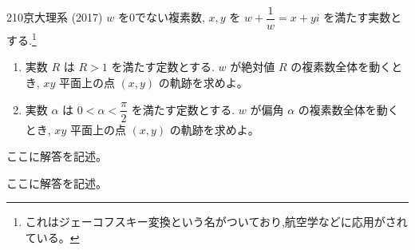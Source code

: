 \begin{thm}{210}{\maru}{京大理系 (2017)}
 $w$ を0でない複素数, $x,y$ を $w+\dfrac{1}{w}=x+yi$ を満たす実数とする.\footnote{これはジェーコフスキー変換という名がついており,航空学などに応用がされている。}
 \begin{enumerate}
  \item 実数 $R$ は $R>1$ を満たす定数とする. $w$ が絶対値 $R$ の複素数全体を動くとき, $xy$ 平面上の点 $(x,y)$ の軌跡を求めよ。
  \item 実数 $\alpha$ は $0<\alpha<\dfrac{\pi}{2}$ を満たす定数とする. $w$ が偏角 $\alpha$ の複素数全体を動くとき, $xy$ 平面上の点 $(x,y)$ の軌跡を求めよ。
 \end{enumerate}
\end{thm}

ここに解答を記述。

ここに解答を記述。